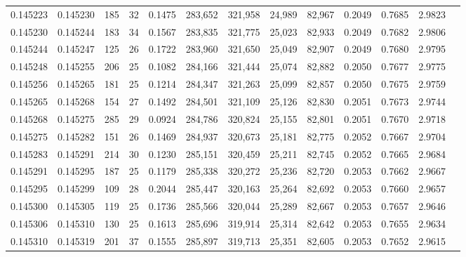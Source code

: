 \begin{tabular}{rrrrrrrrrrrrr}
0.145223 & 0.145230 & 185 &  32 &                                     0.1475 & 283,652 & 321,958 &  24,989 &  82,967 & 0.2049 & 0.7685 & 2.9823 \\
0.145230 & 0.145244 & 183 &  34 &                                     0.1567 & 283,835 & 321,775 &  25,023 &  82,933 & 0.2049 & 0.7682 & 2.9806 \\
0.145244 & 0.145247 & 125 &  26 &                                     0.1722 & 283,960 & 321,650 &  25,049 &  82,907 & 0.2049 & 0.7680 & 2.9795 \\
0.145248 & 0.145255 & 206 &  25 &                                     0.1082 & 284,166 & 321,444 &  25,074 &  82,882 & 0.2050 & 0.7677 & 2.9775 \\
0.145256 & 0.145265 & 181 &  25 &                                     0.1214 & 284,347 & 321,263 &  25,099 &  82,857 & 0.2050 & 0.7675 & 2.9759 \\
0.145265 & 0.145268 & 154 &  27 &                                     0.1492 & 284,501 & 321,109 &  25,126 &  82,830 & 0.2051 & 0.7673 & 2.9744 \\
0.145268 & 0.145275 & 285 &  29 &                                     0.0924 & 284,786 & 320,824 &  25,155 &  82,801 & 0.2051 & 0.7670 & 2.9718 \\
0.145275 & 0.145282 & 151 &  26 &                                     0.1469 & 284,937 & 320,673 &  25,181 &  82,775 & 0.2052 & 0.7667 & 2.9704 \\
0.145283 & 0.145291 & 214 &  30 &                                     0.1230 & 285,151 & 320,459 &  25,211 &  82,745 & 0.2052 & 0.7665 & 2.9684 \\
0.145291 & 0.145295 & 187 &  25 &                                     0.1179 & 285,338 & 320,272 &  25,236 &  82,720 & 0.2053 & 0.7662 & 2.9667 \\
0.145295 & 0.145299 & 109 &  28 &                                     0.2044 & 285,447 & 320,163 &  25,264 &  82,692 & 0.2053 & 0.7660 & 2.9657 \\
0.145300 & 0.145305 & 119 &  25 &                                     0.1736 & 285,566 & 320,044 &  25,289 &  82,667 & 0.2053 & 0.7657 & 2.9646 \\
0.145306 & 0.145310 & 130 &  25 &                                     0.1613 & 285,696 & 319,914 &  25,314 &  82,642 & 0.2053 & 0.7655 & 2.9634 \\
0.145310 & 0.145319 & 201 &  37 &                                     0.1555 & 285,897 & 319,713 &  25,351 &  82,605 & 0.2053 & 0.7652 & 2.9615 \\

\end{tabular}
